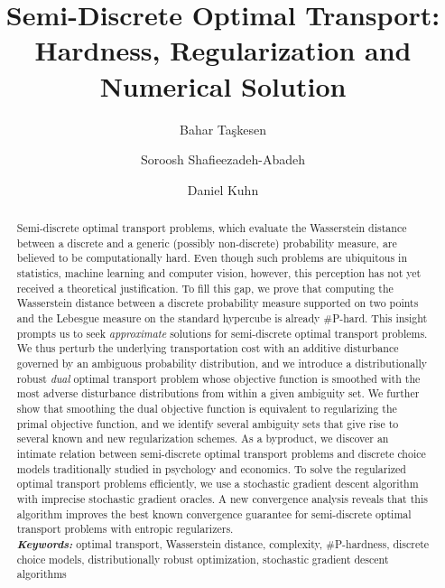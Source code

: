 \documentclass[11pt, a4paper, oneside, reqno]{article}
\author[$\dagger$]{Bahar Ta{\c{s}}kesen}
\author[$\ddagger$]{Soroosh Shafieezadeh-Abadeh}
\author[$\dagger$]{Daniel Kuhn}
\affil[$\dagger$]{Risk Analytics and Optimization Chair, EPFL Lausanne \authorcr \texttt{bahar.taskesen,daniel.kuhn@epfl.ch}}
\affil[$\ddagger$]{Automatic Control Laboratory, ETH Zurich \authorcr \texttt{shafiee@ethz.ch}}
\date{}
\begin{document}
	\title{Semi-Discrete Optimal Transport:\\ Hardness, Regularization and Numerical Solution
	}
	\maketitle
	
	\begin{abstract}
		Semi-discrete optimal transport problems, which evaluate the Wasserstein distance between a discrete and a generic (possibly non-discrete) probability measure, are believed to be computationally hard. Even though such problems are ubiquitous in statistics, machine learning and computer vision, however, this perception has not yet received a theoretical justification. To fill this gap, we prove that computing the Wasserstein distance between a discrete probability measure supported on two points and the Lebesgue measure on the standard hypercube is already $\#$P-hard. This insight prompts us to seek {\em approximate} solutions for semi-discrete optimal transport problems. We thus perturb the underlying transportation cost with an additive disturbance governed by an ambiguous probability distribution, and we introduce a distributionally robust {\em dual} optimal transport problem whose objective function is smoothed with the most adverse disturbance distributions from within a given ambiguity set. We further show that smoothing the dual objective function is equivalent to regularizing the primal objective function, and we identify several ambiguity sets that give rise to several known and new regularization schemes. As a byproduct, we discover an intimate relation between semi-discrete optimal transport problems and discrete choice models traditionally studied in psychology and economics. To solve the regularized optimal transport problems efficiently, we use a stochastic gradient descent algorithm with imprecise stochastic gradient oracles. A new convergence analysis reveals that this algorithm improves the best known convergence guarantee for semi-discrete optimal transport problems with entropic regularizers.\\
		

		\noindent\emph{\textbf{Keywords:}} optimal transport, Wasserstein distance, complexity, $\#$P-hardness, discrete choice models, distributionally robust optimization, stochastic gradient descent algorithms
	\end{abstract}
	
\end{document}
